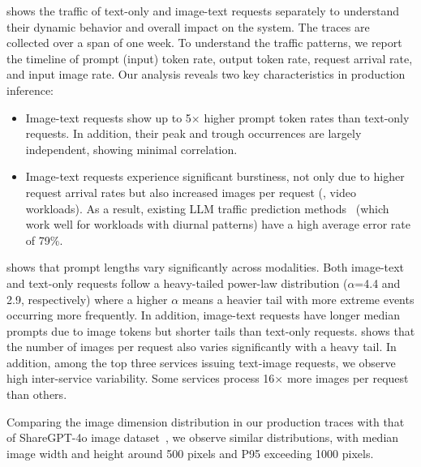 
 shows the traffic of text-only and image-text requests separately to understand their dynamic behavior and overall impact on the system.
The traces are collected over a span of one week. 
To understand the traffic patterns, we report the timeline of prompt (input) token rate, output token rate, request arrival rate, and input image rate.
Our analysis reveals two key characteristics in production \lmm{} inference:
\begin{itemize}[nosep]
\item {}
Image-text requests show up to 5$\times$ higher prompt token rates than text-only requests.
In addition, their peak and trough occurrences are largely independent, showing minimal correlation.
\item {}
Image-text requests experience significant burstiness, not only due to higher request arrival rates but also increased images per request (\eg{}, video workloads). As a result, existing LLM traffic prediction methods~\cite{stojkovic2024dynamollm} (which work well for workloads with diurnal patterns) have a high average error rate of 79\%.
\end{itemize}



 shows that prompt lengths vary significantly across modalities.
Both image-text and text-only requests follow a heavy-tailed power-law distribution ($\alpha$=4.4 and 2.9, respectively) where a higher $\alpha$ means a heavier tail with more extreme events occurring more frequently.
In addition, image-text requests have longer median prompts due to image tokens but shorter tails than text-only requests.
 shows that the number of images per request also varies significantly with a heavy tail.
In addition, among the top three services issuing text-image requests, we observe high inter-service variability.
Some services process 16$\times$ more images per request than others.

Comparing the image dimension distribution in our production traces with that of ShareGPT-4o image dataset~\cite{chen2024far}, we observe similar distributions, with median image width and height around 500 pixels and P95 exceeding 1000 pixels.

\label{insight:6}

